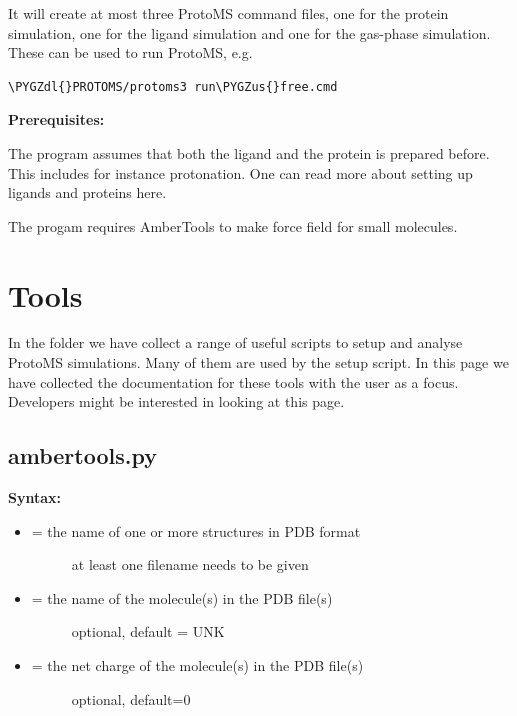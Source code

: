 \documentclass[letterpaper,10pt,english]{sphinxmanual}
\def\PYGZus{\char`\_}
\def\PYGZdl{\char`\$}
\begin{document}
It will create at most three ProtoMS command files, one for the protein simulation, one for the ligand simulation and one for the gas-phase simulation. These can be used to run ProtoMS, e.g.

\begin{Verbatim}[frame=single,commandchars=\\\{\}]
\PYGZdl{}PROTOMS/protoms3 run\PYGZus{}free.cmd
\end{Verbatim}

\textbf{Prerequisites:}

The program assumes that both the ligand and the protein is prepared before. This includes for instance protonation. One can read more about setting up ligands and proteins here.

The progam requires AmberTools to make force field for small molecules.


\chapter{Tools}
\label{tools:tools}\label{tools::doc}
In the  folder we have collect a range of useful scripts to setup and analyse ProtoMS simulations. Many of them are used by the  setup script. In this page we have collected the documentation for these tools with the user as a focus. Developers might be interested in looking at this page.


\section{ambertools.py}
\label{tools:ambertools-py}
\textbf{Syntax:}

\begin{itemize}
\item {} \begin{description}
\item[{ = the name of one or more structures in PDB format}] \leavevmode
at least one filename needs to be given

\end{description}

\item {} \begin{description}
\item[{ = the name of the molecule(s) in the PDB file(s)}] \leavevmode
optional, default = UNK

\end{description}

\item {} \begin{description}
\item[{ = the net charge of the molecule(s) in the PDB file(s)}] \leavevmode
optional, default=0

\end{description}

\end{itemize}
\end{document}
